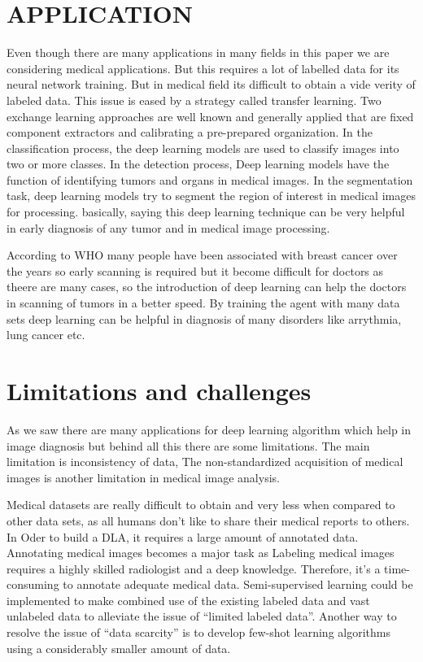 \documentclass{article}
\begin{document}
 
\section*{APPLICATION }


Even though there are many applications in many fields in this paper we are considering medical applications. But this requires a lot of labelled data for its neural network training. But in medical field its difficult to obtain a vide verity of labeled data. This issue is eased by a strategy called transfer learning. Two exchange learning approaches are well known and generally applied that are fixed component extractors and calibrating a pre-prepared organization. In the classification process, the deep learning models are used to classify images into two or more classes. In the detection process, Deep learning models have the function of identifying tumors and organs in medical images. In the segmentation task, deep learning models try to segment the region of interest in medical images for processing. basically, saying this deep learning technique can be very helpful in early diagnosis of any tumor and in medical image processing. 

According to WHO many people have been associated with breast cancer over the years so early scanning is required but it become difficult for doctors as theere are many cases, so the introduction of deep learning can help the doctors in scanning of tumors in a better speed. By training the agent with many data sets deep learning can be helpful in diagnosis of many disorders like arrythmia, lung cancer etc. 


\section*{Limitations and challenges }



 As we saw there are many applications for deep learning algorithm which help in image diagnosis but behind all this there are some limitations. The main limitation is inconsistency of data, The non-standardized acquisition of medical images is another limitation in medical image analysis. 

Medical datasets are really difficult to obtain and very less when compared to other data sets, as all humans don’t like to share their medical reports to others. In Oder to build a DLA, it requires a large amount of annotated data. Annotating medical images becomes a major task as Labeling medical images requires a highly skilled radiologist and a deep knowledge. Therefore, it's a time-consuming to annotate adequate medical data. Semi-supervised learning could be implemented to make combined use of the existing labeled data and vast unlabeled data to alleviate the issue of “limited labeled data”. Another way to resolve the issue of “data scarcity” is to develop few-shot learning algorithms using a considerably smaller amount of data.
\end{document}
